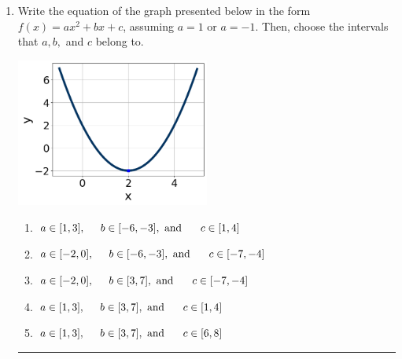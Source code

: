 \documentclass[14pt]{extbook}
\newcommand{\litem}[1]{\item#1\hspace*{-1cm}\rule{\textwidth}{0.4pt}}
\begin{document}
\begin{enumerate}
{\begin{enumerate}[label=\Alph*.]
\end{enumerate} }
\litem{
Write the equation of the graph presented below in the form $f(x)=ax^2+bx+c$, assuming  $a=1$ or $a=-1$. Then, choose the intervals that $a, b,$ and $c$ belong to.
\begin{center}
    \includegraphics[width=0.5\textwidth]{../Figures/quadraticGraphToEquationCopyA.png}
\end{center}
\begin{enumerate}[label=\Alph*.]
\item \( a \in [1, 3], \hspace*{5mm} b \in [-6, -3], \text{ and } \hspace*{5mm} c \in [1, 4] \)
\item \( a \in [-2, 0], \hspace*{5mm} b \in [-6, -3], \text{ and } \hspace*{5mm} c \in [-7, -4] \)
\item \( a \in [-2, 0], \hspace*{5mm} b \in [3, 7], \text{ and } \hspace*{5mm} c \in [-7, -4] \)
\item \( a \in [1, 3], \hspace*{5mm} b \in [3, 7], \text{ and } \hspace*{5mm} c \in [1, 4] \)
\item \( a \in [1, 3], \hspace*{5mm} b \in [3, 7], \text{ and } \hspace*{5mm} c \in [6, 8] \)


\end{enumerate}}
\end{enumerate}
\end{document}
